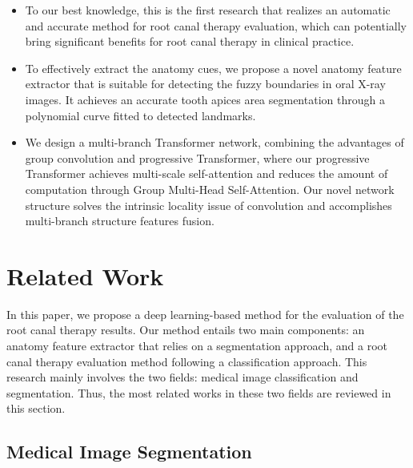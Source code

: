 \documentclass[journal]{IEEEtran}
\begin{document}
\begin{itemize}
    \item To our best knowledge, this is the first research that realizes an automatic and accurate method for root canal therapy evaluation, which can potentially bring significant benefits for root canal therapy in clinical practice.

    \item To effectively extract the anatomy cues, we propose a novel anatomy feature extractor that is suitable for detecting the fuzzy boundaries in oral X-ray images. It achieves an accurate tooth apices area segmentation through a polynomial curve fitted to detected landmarks.

    \item We design a multi-branch Transformer network, combining the advantages of group convolution and progressive Transformer, where our progressive Transformer achieves multi-scale self-attention and reduces the amount of computation through Group Multi-Head Self-Attention. Our novel network structure solves the intrinsic locality issue of convolution and accomplishes multi-branch structure features fusion.
\end{itemize}


\section{Related Work}
In this paper, we propose a deep learning-based method for the evaluation of the root canal therapy results. Our method entails two main components: an anatomy feature extractor that relies on a segmentation approach, and a root canal therapy evaluation method following a classification approach. This research mainly involves the two fields: medical image classification and segmentation\cite{9286475,8861329,9122550,7523288,9269406}. Thus, the most related works in these two fields are reviewed in this section. 


\subsection{Medical Image Segmentation}
\end{document}
